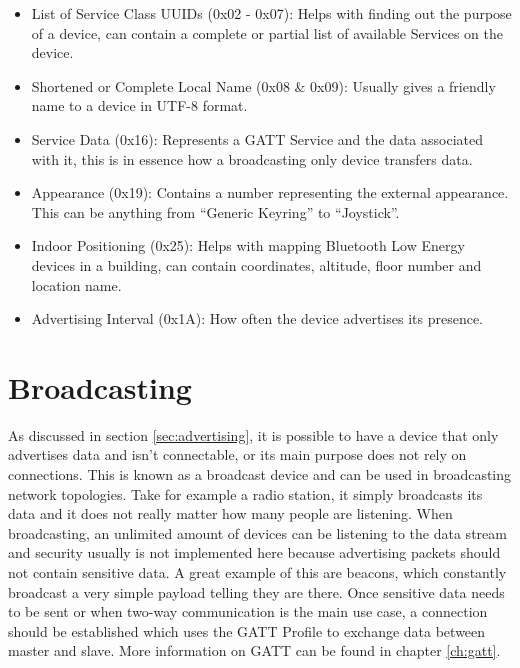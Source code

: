 \documentclass[pdftex,a4paper,12pt,twoside]{report}
\begin{document}
\begin{itemize}
	\item {List of Service Class UUIDs (0x02 - 0x07): Helps with finding out the purpose of a device, can contain a complete or partial list of available Services on the device.}
	\item {Shortened or Complete Local Name (0x08 \& 0x09): Usually gives a friendly name to a device in UTF-8 format.}
	\item {Service Data (0x16): Represents a GATT Service and the data associated with it, this is in essence how a broadcasting only device transfers data.}
	\item {Appearance (0x19): Contains a number representing the external appearance. This can be anything from ``Generic Keyring'' to ``Joystick''.}
	\item {Indoor Positioning (0x25): Helps with mapping Bluetooth Low Energy devices in a building, can contain coordinates, altitude, floor number and location name.}
	\item {Advertising Interval (0x1A): How often the device advertises its presence.}
\end{itemize}

\section{Broadcasting}
\label{sec:broadcasting}
As discussed in section \ref{sec:advertising}, it is possible to have a device that only advertises data and isn't connectable, or its main purpose does not rely on connections. This is known as a broadcast device and can be used in broadcasting network topologies. Take for example a radio station, it simply broadcasts its data and it does not really matter how many people are listening. When broadcasting, an unlimited amount of devices can be listening to the data stream and security usually is not implemented here because advertising packets should not contain sensitive data. A great example of this are beacons, which constantly broadcast a very simple payload telling they are there. Once sensitive data needs to be sent or when two-way communication is the main use case, a connection should be established which uses the GATT Profile to exchange data between master and slave. More information on GATT can be found in chapter \ref{ch:gatt}.
\end{document}
